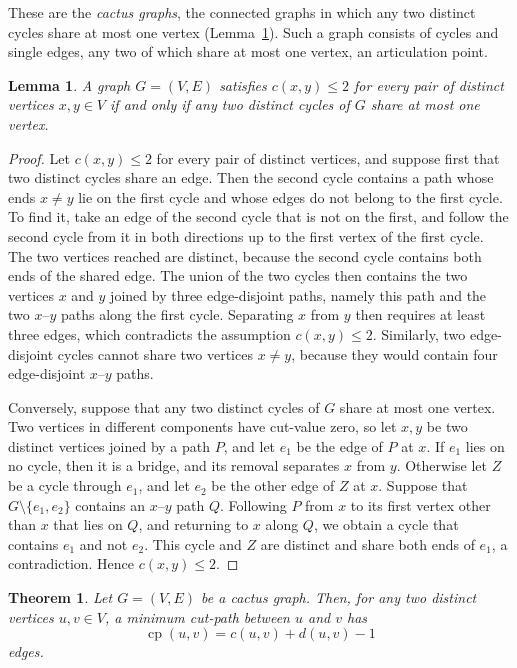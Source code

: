 \documentclass[a4paper,fleqn]{cas-sc}
\numberwithin{equation}{section}
\theoremstyle{definition}
\theoremstyle{plain}
\newtheorem{theorem}[definition]{Theorem}
\newtheorem{lemma}[definition]{Lemma}
\theoremstyle{remark}
\newcommand{\cp}{\operatorname{cp}}                  %
\begin{document}
These are the \emph{cactus graphs}, the connected graphs in which any two distinct cycles share at most one vertex (Lemma~\ref{lem:cactus}).
Such a graph consists of cycles and single edges, any two of which share at most one vertex, an articulation point.

\begin{lemma}
\label{lem:cactus}
A graph $G = (V, E)$ satisfies $c(x, y) \leq 2$ for every pair of distinct vertices $x, y \in V$ if and only if any two distinct cycles of $G$ share at most one vertex.
\end{lemma}

\begin{proof}
Let $c(x, y) \leq 2$ for every pair of distinct vertices, and suppose first that two distinct cycles share an edge.
Then the second cycle contains a path whose ends $x \neq y$ lie on the first cycle and whose edges do not belong to the first cycle.
To find it, take an edge of the second cycle that is not on the first, and follow the second cycle from it in both directions up to the first vertex of the first cycle.
The two vertices reached are distinct, because the second cycle contains both ends of the shared edge.
The union of the two cycles then contains the two vertices $x$ and $y$ joined by three edge-disjoint paths, namely this path and the two $x$--$y$ paths along the first cycle.
Separating $x$ from $y$ then requires at least three edges, which contradicts the assumption $c(x,y) \leq 2$.
Similarly, two edge-disjoint cycles cannot share two vertices $x \neq y$, because they would contain four edge-disjoint $x$--$y$ paths.

Conversely, suppose that any two distinct cycles of $G$ share at most one vertex.
Two vertices in different components have cut-value zero, so let $x, y$ be two distinct vertices joined by a path $P$, and let $e_1$ be the edge of $P$ at $x$.
If $e_1$ lies on no cycle, then it is a bridge, and its removal separates $x$ from $y$.
Otherwise let $Z$ be a cycle through $e_1$, and let $e_2$ be the other edge of $Z$ at $x$.
Suppose that $G \setminus \{e_1, e_2\}$ contains an $x$--$y$ path $Q$.
Following $P$ from $x$ to its first vertex other than $x$ that lies on $Q$, and returning to $x$ along $Q$, we obtain a cycle that contains $e_1$ and not $e_2$.
This cycle and $Z$ are distinct and share both ends of $e_1$, a contradiction.
Hence $c(x, y) \leq 2$.
\end{proof}

\begin{theorem}
\label{thm:cut-two}
Let $G = (V, E)$ be a cactus graph.
Then, for any two distinct vertices $u,v \in V$, a minimum cut-path between $u$ and $v$ has
\[
\cp(u, v) = c(u, v) + d(u, v) - 1
\]
edges.
\end{theorem}
\end{document}
